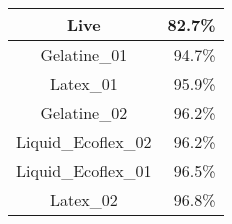 \begin{tabular}{ c   r }
    Live                & 82.7\% \\  \hline\hline
    Gelatine\_01        & 94.7\% \\
    Latex\_01           & 95.9\% \\
    Gelatine\_02        & 96.2\% \\
    Liquid\_Ecoflex\_02 & 96.2\% \\
    Liquid\_Ecoflex\_01 & 96.5\% \\
    Latex\_02           & 96.8\% \\
\end{tabular}

